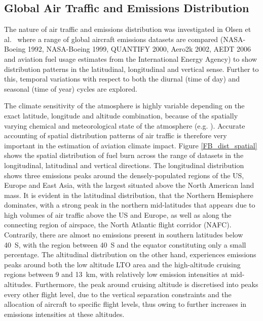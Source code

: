 
\subsection{Global Air Traffic and Emissions Distribution}
The nature of air traffic and emissions distribution was investigated in Olsen et al.\ \cite{Olsen2013} where a range of global aircraft emissions datasets are compared (NASA-Boeing 1992, NASA-Boeing 1999, QUANTIFY 2000, Aero2k 2002, AEDT 2006 and aviation fuel usage estimates from the International Energy Agency) to show distribution patterns in the latitudinal, longitudinal and vertical sense. Further to this, temporal variations with respect to both the diurnal (time of day) and seasonal (time of year) cycles are explored.

The climate sensitivity of the atmosphere is highly variable depending on the exact latitude, longitude and altitude combination, because of the spatially varying chemical and meteorological state of the atmosphere (e.g. \cite{Houghton2001, Inness2013, Emmons2000}). Accurate accounting of spatial distribution patterns of air traffic is therefore very important in the estimation of aviation climate impact. Figure \ref{FB_dist_spatial} shows the spatial distribution of fuel burn across the range of datasets in the longitudinal, latitudinal and vertical directions. The longitudinal distribution shows three emissions peaks around the densely-populated regions of the US, Europe and East Asia, with the largest situated above the North American land mass. It is evident in the latitudinal distribution, that the Northern Hemisphere dominates, with a strong peak in the northern mid-latitudes that appears due to high volumes of air traffic above the US and Europe, as well as along the connecting region of airspace, the North Atlantic flight corridor (NAFC). Contrarily, there are almost no emissions present in southern latitudes below 40\textdegree~S, with the region between 40\textdegree~S and the equator constituting only a small percentage. The altitudinal distribution on the other hand, experiences emissions peaks around both the low altitude LTO area and the high-altitude cruising regions between 9 and 13~km, with relatively low emission intensities at mid-altitudes. Furthermore, the peak around cruising altitude is discretised into peaks every other flight level, due to the vertical separation constraints and the allocation of aircraft to specific flight levels, thus owing to further increases in emissions intensities at these altitudes.

